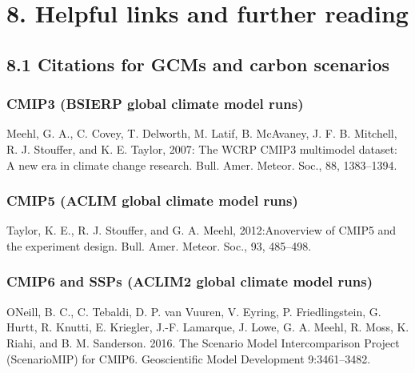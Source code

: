 \documentclass[
]{article}
\begin{document}
\hypertarget{helpful-links-and-further-reading}{%
\section{8. Helpful links and further
reading}\label{helpful-links-and-further-reading}}

\hypertarget{citations-for-gcms-and-carbon-scenarios}{%
\subsection{8.1 Citations for GCMs and carbon
scenarios}\label{citations-for-gcms-and-carbon-scenarios}}

\hypertarget{cmip3-bsierp-global-climate-model-runs}{%
\subsubsection{CMIP3 (BSIERP global climate model
runs)}\label{cmip3-bsierp-global-climate-model-runs}}

Meehl, G. A., C. Covey, T. Delworth, M. Latif, B. McAvaney, J. F. B.
Mitchell, R. J. Stouffer, and K. E. Taylor, 2007: The WCRP CMIP3
multimodel dataset: A new era in climate change research. Bull. Amer.
Meteor. Soc., 88, 1383--1394.

\hypertarget{cmip5-aclim-global-climate-model-runs}{%
\subsubsection{CMIP5 (ACLIM global climate model
runs)}\label{cmip5-aclim-global-climate-model-runs}}

Taylor, K. E., R. J. Stouffer, and G. A. Meehl, 2012:Anoverview of CMIP5
and the experiment design. Bull. Amer. Meteor. Soc., 93, 485--498.

\hypertarget{cmip6-and-ssps-aclim2-global-climate-model-runs}{%
\subsubsection{CMIP6 and SSPs (ACLIM2 global climate model
runs)}\label{cmip6-and-ssps-aclim2-global-climate-model-runs}}

ONeill, B. C., C. Tebaldi, D. P. van Vuuren, V. Eyring, P.
Friedlingstein, G. Hurtt, R. Knutti, E. Kriegler, J.-F. Lamarque, J.
Lowe, G. A. Meehl, R. Moss, K. Riahi, and B. M. Sanderson. 2016. The
Scenario Model Intercomparison Project (ScenarioMIP) for CMIP6.
Geoscientific Model Development 9:3461--3482.
\end{document}

